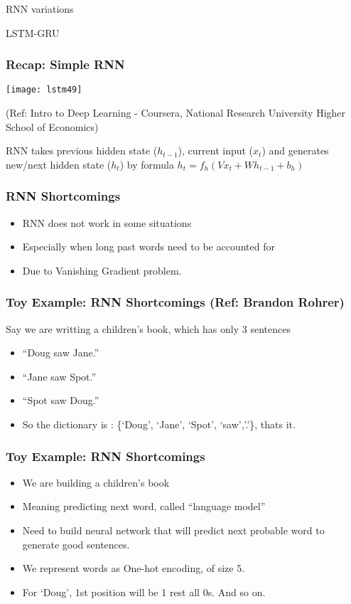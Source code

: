 \begin{frame}
  \begin{center}
    {\Large RNN variations}
    
    LSTM-GRU
  \end{center}
\end{frame}

\begin{frame}[fragile] \frametitle{Recap: Simple RNN}
\begin{center}
\texttt{[image: lstm49]}

\tiny{(Ref: Intro to Deep Learning - Coursera, National Research University Higher School of Economics)}
\end{center}
RNN takes previous hidden state ($h_{t-1}$), current input ($x_t$) and generates new/next hidden state ($h_t$) by formula $h_t = f_h ( Vx_t + Wh_{t-1} + b_h)$
\end{frame}

\begin{frame}[fragile] \frametitle{RNN Shortcomings}
\begin{itemize}
\item RNN does not work in some situations
\item Especially when long past words need to be accounted for
\item Due to Vanishing Gradient problem.
\end{itemize}
\end{frame}

\begin{frame}[fragile] \frametitle{Toy Example: RNN Shortcomings (Ref: Brandon Rohrer)}
Say we are writting a children's book, which has only 3 sentences
\begin{itemize}
\item ``Doug saw Jane.''
\item ``Jane saw Spot.''
\item ``Spot saw Doug.''
\item So the dictionary is : \{`Doug', `Jane', `Spot', `saw','.'\}, thats it.
\end{itemize}
\end{frame}

\begin{frame}[fragile] \frametitle{Toy Example: RNN Shortcomings}
\begin{itemize}
\item We are building a children's book
\item Meaning predicting next word, called ``language model''
\item Need to build neural network that will predict next probable word to generate good sentences.
\item We represent words as One-hot encoding, of size 5.
\item For `Doug', 1st position will be 1 rest all 0s. And so on.
\end{itemize}
\end{frame}

